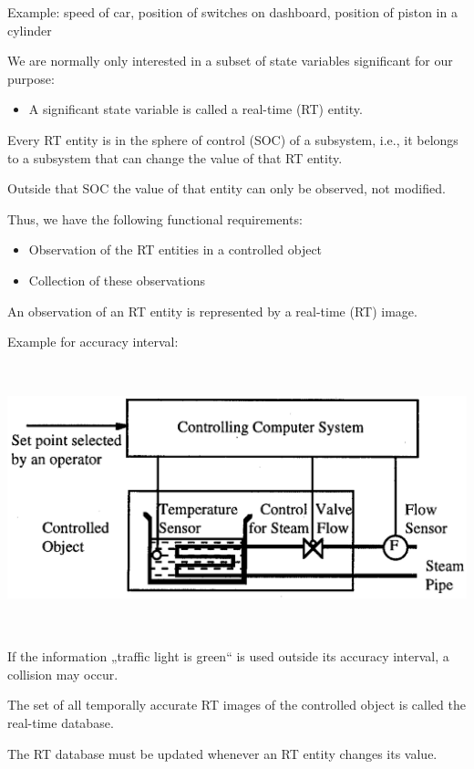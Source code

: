 Example: speed of car, position of switches on dashboard, position of
piston in a cylinder

We are normally only interested in a subset of state variables
significant for our purpose:

\begin{itemize}
\item
  A significant state variable is called a real-time (RT) entity.
\end{itemize}

Every RT entity is in the sphere of control (SOC) of a subsystem, i.e.,
it belongs to a subsystem that can change the value of that RT entity.

Outside that SOC the value of that entity can only be observed, not
modified.

Thus, we have the following functional requirements:

\begin{itemize}
\item
  Observation of the RT entities in a controlled object
\item
  Collection of these observations
\end{itemize}

An observation of an RT entity is represented by a real-time (RT) image.

Example for accuracy interval:

\includegraphics[width=6.67708in,height=3.05208in]{media/Fig_1_3.png}

If the information „traffic light is green`` is used outside its
accuracy interval, a collision may occur.

The set of all temporally accurate RT images of the controlled object is
called the real-time database.

The RT database must be updated whenever an RT entity changes its value.

